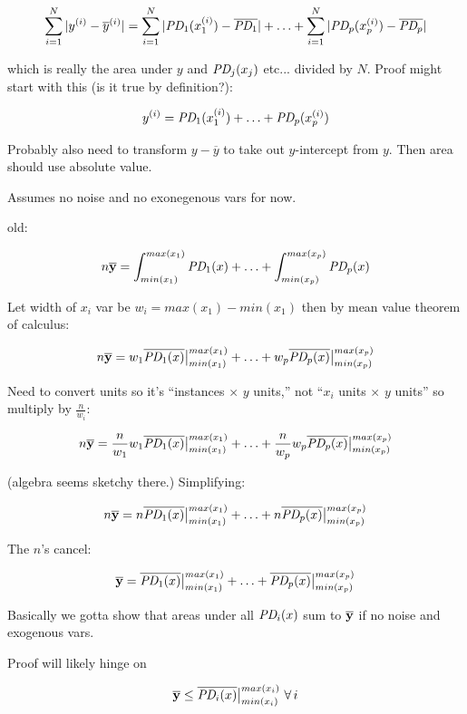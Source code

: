\documentclass[12pt]{article}
\begin{document}
\[
\sum_{i=1}^{N} |y^{(i)}-\overline{y}^{(i)}| = \sum_{i=1}^{N} |\text{\it PD}_1(x_1^{(i)})-\overline{\text{\it PD}_1}| + \ldots + \sum_{i=1}^{N} |\text{\it PD}_p(x_p^{(i)})-\overline{\text{\it PD}_p}|
\]

\noindent which is really the area under $y$ and $\text{\it PD}_j(x_j)$ etc... divided by $N$.   Proof might start with this (is it true by definition?):

\[
y^{(i)} = \text{\it PD}_1(x_1^{(i)}) + \ldots + \text{\it PD}_p(x_p^{(i)})
\]

\noindent Probably also need to transform $y - \overline{y}$ to take out $y$-intercept from $y$.  Then area should use absolute value.

Assumes no noise and no exonegenous vars for now.

old:

\[
n \overline {\bf y} = \int_{min(x_1)}^{max(x_1)} \text{\it PD}_1(x) + \ldots + \int_{min(x_p)}^{max(x_p)} \text{\it PD}_p(x)
\]

Let width of $x_i$ var be $w_i = max(x_1)-min(x_1)$ then by mean value theorem of calculus:

\[
n \overline {\bf y} = w_1\overline{\text{\it PD}_1(x)}\big |_{min(x_1)}^{max(x_1)} + \ldots + w_p\overline{\text{\it PD}_p(x)}\big |_{min(x_p)}^{max(x_p)}
\]

Need to convert units so it's ``instances $\times$ $y$ units,'' not ``$x_i$ units $\times$ $y$ units'' so multiply by $\frac{n}{w_i}$:

\[
n \overline {\bf y} = \frac{n}{w_1} w_1\overline{\text{\it PD}_1(x)}\big |_{min(x_1)}^{max(x_1)} + \ldots + \frac{n}{w_p} w_p\overline{\text{\it PD}_p(x)}\big |_{min(x_p)}^{max(x_p)}
\]

(algebra seems sketchy there.) Simplifying:

\[
n \overline {\bf y} = n\overline{\text{\it PD}_1(x)}\big |_{min(x_1)}^{max(x_1)} + \ldots + n \overline{\text{\it PD}_p(x)}\big |_{min(x_p)}^{max(x_p)}
\]

The $n$'s cancel:

\[
\overline {\bf y} = \overline{\text{\it PD}_1(x)}\big |_{min(x_1)}^{max(x_1)} + \ldots + \overline{\text{\it PD}_p(x)}\big |_{min(x_p)}^{max(x_p)}
\]

Basically we gotta show that areas under all $\text{\it PD}_i(x)$ sum to $\overline{\bf y}$ if no noise and exogenous vars.

Proof will likely hinge on

\[
\overline {\bf y} \le \overline{\text{\it PD}_i(x)}\big |_{min(x_i)}^{max(x_i)} ~\forall\, i
\]
\end{document}
